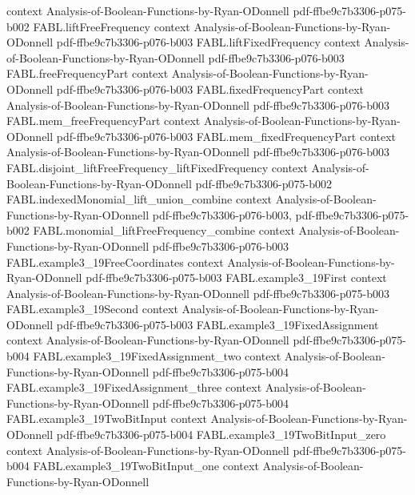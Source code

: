 \begin{theorem}
  {context}
  {Analysis-of-Boolean-Functions-by-Ryan-ODonnell}
  {pdf-ffbe9c7b3306-p075-b002}
\proofstep
  {FABL.liftFreeFrequency}
  {context}
  {Analysis-of-Boolean-Functions-by-Ryan-ODonnell}
  {pdf-ffbe9c7b3306-p076-b003}
\proofstep
  {FABL.liftFixedFrequency}
  {context}
  {Analysis-of-Boolean-Functions-by-Ryan-ODonnell}
  {pdf-ffbe9c7b3306-p076-b003}
\proofstep
  {FABL.freeFrequencyPart}
  {context}
  {Analysis-of-Boolean-Functions-by-Ryan-ODonnell}
  {pdf-ffbe9c7b3306-p076-b003}
\proofstep
  {FABL.fixedFrequencyPart}
  {context}
  {Analysis-of-Boolean-Functions-by-Ryan-ODonnell}
  {pdf-ffbe9c7b3306-p076-b003}
\proofstep
  {FABL.mem_freeFrequencyPart}
  {context}
  {Analysis-of-Boolean-Functions-by-Ryan-ODonnell}
  {pdf-ffbe9c7b3306-p076-b003}
\proofstep
  {FABL.mem_fixedFrequencyPart}
  {context}
  {Analysis-of-Boolean-Functions-by-Ryan-ODonnell}
  {pdf-ffbe9c7b3306-p076-b003}
\proofstep
  {FABL.disjoint_liftFreeFrequency_liftFixedFrequency}
  {context}
  {Analysis-of-Boolean-Functions-by-Ryan-ODonnell}
  {pdf-ffbe9c7b3306-p075-b002}
\proofstep
  {FABL.indexedMonomial_lift_union_combine}
  {context}
  {Analysis-of-Boolean-Functions-by-Ryan-ODonnell}
  {pdf-ffbe9c7b3306-p076-b003,
    pdf-ffbe9c7b3306-p075-b002}
\proofstep
  {FABL.monomial_liftFreeFrequency_combine}
  {context}
  {Analysis-of-Boolean-Functions-by-Ryan-ODonnell}
  {pdf-ffbe9c7b3306-p076-b003}
\proofstep
  {FABL.example3_19FreeCoordinates}
  {context}
  {Analysis-of-Boolean-Functions-by-Ryan-ODonnell}
  {pdf-ffbe9c7b3306-p075-b003}
\proofstep
  {FABL.example3_19First}
  {context}
  {Analysis-of-Boolean-Functions-by-Ryan-ODonnell}
  {pdf-ffbe9c7b3306-p075-b003}
\proofstep
  {FABL.example3_19Second}
  {context}
  {Analysis-of-Boolean-Functions-by-Ryan-ODonnell}
  {pdf-ffbe9c7b3306-p075-b003}
\proofstep
  {FABL.example3_19FixedAssignment}
  {context}
  {Analysis-of-Boolean-Functions-by-Ryan-ODonnell}
  {pdf-ffbe9c7b3306-p075-b004}
\proofstep
  {FABL.example3_19FixedAssignment_two}
  {context}
  {Analysis-of-Boolean-Functions-by-Ryan-ODonnell}
  {pdf-ffbe9c7b3306-p075-b004}
\proofstep
  {FABL.example3_19FixedAssignment_three}
  {context}
  {Analysis-of-Boolean-Functions-by-Ryan-ODonnell}
  {pdf-ffbe9c7b3306-p075-b004}
\proofstep
  {FABL.example3_19TwoBitInput}
  {context}
  {Analysis-of-Boolean-Functions-by-Ryan-ODonnell}
  {pdf-ffbe9c7b3306-p075-b004}
\proofstep
  {FABL.example3_19TwoBitInput_zero}
  {context}
  {Analysis-of-Boolean-Functions-by-Ryan-ODonnell}
  {pdf-ffbe9c7b3306-p075-b004}
\proofstep
  {FABL.example3_19TwoBitInput_one}
  {context}
  {Analysis-of-Boolean-Functions-by-Ryan-ODonnell}

\end{theorem}
